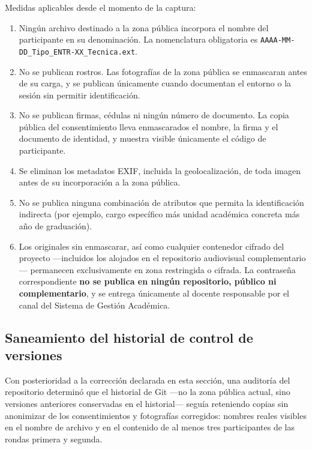 \documentclass[11pt,a4paper]{article}
\begin{document}
Medidas aplicables desde el momento de la captura:

\begin{enumerate}[leftmargin=*,itemsep=2pt]
  \item Ningún archivo destinado a la zona pública incorpora el nombre del participante en su
        denominación. La nomenclatura obligatoria es \texttt{AAAA-MM-DD\_Tipo\_ENTR-XX\_Tecnica.ext}.
  \item No se publican rostros. Las fotografías de la zona pública se enmascaran antes de su carga, y se
        publican únicamente cuando documentan el entorno o la sesión sin permitir identificación.
  \item No se publican firmas, cédulas ni ningún número de documento. La copia pública del consentimiento
        lleva enmascarados el nombre, la firma y el documento de identidad, y muestra visible únicamente
        el código de participante.
  \item Se eliminan los metadatos EXIF, incluida la geolocalización, de toda imagen antes de su
        incorporación a la zona pública.
  \item No se publica ninguna combinación de atributos que permita la identificación indirecta
        (por ejemplo, cargo específico más unidad académica concreta más año de graduación).
  \item Los originales sin enmascarar, así como cualquier contenedor cifrado del proyecto ---incluidos los
        alojados en el repositorio audiovisual complementario--- permanecen exclusivamente en zona
        restringida o cifrada. La contraseña correspondiente \textbf{no se publica en ningún repositorio,
        público ni complementario}, y se entrega únicamente al docente responsable por el canal del
        Sistema de Gestión Académica.
\end{enumerate}

\subsection{Saneamiento del historial de control de versiones}

Con posterioridad a la corrección declarada en esta sección, una auditoría del repositorio determinó que
el historial de Git ---no la zona pública actual, sino versiones anteriores conservadas en el historial---
seguía reteniendo copias sin anonimizar de los consentimientos y fotografías corregidos: nombres reales
visibles en el nombre de archivo y en el contenido de al menos tres participantes de las rondas primera y
segunda.
\end{document}
